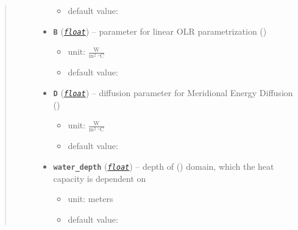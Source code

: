 \documentclass[a4paper,10pt,english]{sphinxmanual}
\begin{document}
\begin{fulllineitems}
\begin{quote}
\begin{description}
\begin{itemize}
\begin{itemize}
\item {} 
default value: 

\end{itemize}


\item {} 
\textbf{\texttt{B}} (\href{http://docs.python.org/2.7/library/functions.html\#float}{\emph{\texttt{float}}}) -- 
parameter for linear OLR parametrization
{\hyperref[api/climlab.radiation:climlab.radiation.AplusBT.AplusBT]{\emph{}}} ()
\begin{itemize}
\item {} 
unit: \(\frac{\textrm{W}}{\textrm{m}^2 \ ^{\circ} \textrm{C}}\)

\item {} 
default value: 

\end{itemize}


\item {} 
\textbf{\texttt{D}} (\href{http://docs.python.org/2.7/library/functions.html\#float}{\emph{\texttt{float}}}) -- 
diffusion parameter for Meridional Energy Diffusion
{\hyperref[api/climlab.dynamics:climlab.dynamics.diffusion.MeridionalDiffusion]{\emph{}}} ()
\begin{itemize}
\item {} 
unit: \(\frac{\textrm{W}}{\textrm{m}^2 \ ^{\circ} \textrm{C}}\)

\item {} 
default value: 

\end{itemize}


\item {} 
\textbf{\texttt{water\_depth}} (\href{http://docs.python.org/2.7/library/functions.html\#float}{\emph{\texttt{float}}}) -- 
depth of {\hyperref[api/climlab.domain:climlab.domain.domain.zonal_mean_surface]{\emph{}}} ()
domain, which the heat capacity is dependent on
\begin{itemize}
\item {} 
unit: meters

\item {} 
default value: 

\end{itemize}



\end{itemize}
\end{description}
\end{quote}
\end{fulllineitems}
\end{document}
